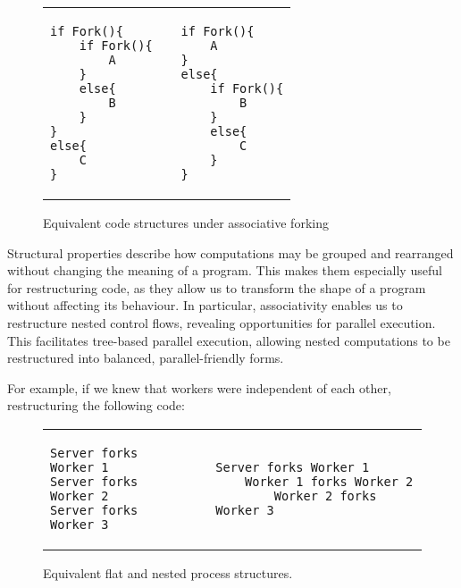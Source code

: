 \documentclass[logo,bsc,singlespacing,parskip]{infthesis}
\begin{document}
\vspace{-2em}
\begin{figure}[H]
    \centering


\begin{table}[H]
\centering
\begin{tabular}{p{} c p{}}
\begin{lstlisting}
if Fork(){
    if Fork(){
        A
    }
    else{
        B
    }
}
else{
    C
}
\end{lstlisting}
&
&
\begin{lstlisting}
if Fork(){
    A
} 
else{
    if Fork(){
        B
    }
    else{
        C
    }
}
\end{lstlisting}
\end{tabular}
\end{table}
\vspace{-2em}

    \caption{Equivalent code structures under associative forking}
    \label{fig:enter-label}
\end{figure}




Structural properties describe how computations may be grouped and rearranged without changing the meaning of a program. This makes them especially useful for restructuring code, as they allow us to transform the shape of a program without affecting its behaviour. In particular, associativity enables us to restructure nested control flows, revealing opportunities for parallel execution. This facilitates tree-based parallel execution, allowing nested computations to be restructured into balanced, parallel-friendly forms.

For example, if we knew that workers were independent of each other, restructuring the following code:
\vspace{-1em} %
\begin{figure}[H]
    \centering
    \begin{tabular}{p{} c p{}}
        \begin{lstlisting}
Server forks Worker 1
Server forks Worker 2
Server forks Worker 3
        \end{lstlisting}
        &
        &
        \begin{lstlisting}
Server forks Worker 1
    Worker 1 forks Worker 2
        Worker 2 forks Worker 3
        \end{lstlisting}
    \end{tabular}
    \vspace{-1em} %

    \caption{Equivalent flat and nested process structures.}
    \label{fig:process-restructuring}
\end{figure}
\end{document}
